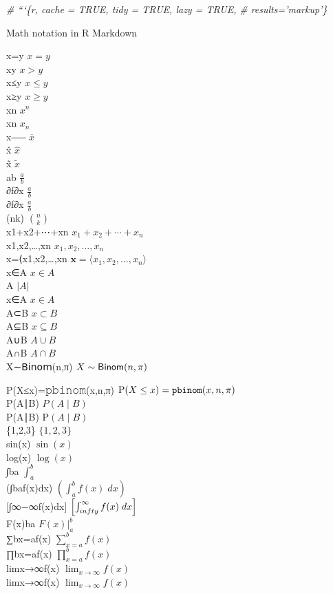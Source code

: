 \documentclass[10,portrait]{article}
\newenvironment{Shaded}{\begin{snugshade}}{\end{snugshade}}
\newcommand{\CommentTok}[1]{\textcolor[rgb]{0.56,0.35,0.01}{\textit{#1}}}
\begin{document}
\begin{Shaded}
\begin{Highlighting}[]
\CommentTok{# ```\{r, cache = TRUE, tidy = TRUE, lazy = TRUE,}
\CommentTok{# results='markup'\}}
\end{Highlighting}
\end{Shaded}

Math notation in R Markdown

x=y \(x = y\)\\
xy \(x > y\)\\
x≤y \(x \le y\)\\
x≥y \(x \ge y\)\\
xn \(x^{n}\)\\
xn \(x_{n}\)\\
x⎯⎯⎯ \(\overline{x}\)\\
x̂ \(\hat{x}\)\\
x̃ \(\tilde{x}\)\\
ab \(\frac{a}{b}\)\\
∂f∂x \(\frac{a}{b}\)\\
∂f∂x \(\displaystyle \frac{a}{b}\)\\
(nk) \(\binom{n}{k}\)\\
x1+x2+⋯+xn \(x_{1} + x_{2} + \cdots + x_{n}\)\\
x1,x2,\ldots{},xn \(x_{1}, x_{2}, \dots, x_{n}\)\\
x=⟨x1,x2,\ldots{},xn
\(\mathbf{x} = \langle x_{1}, x_{2}, \dots, x_{n}\rangle\)\\
x∈A \(x \in A\)\\
\textbar{}A\textbar{} \(|A|\)\\
x∈A \(x \in A\)\\
A⊂B \(x \subset B\)\\
A⊆B \(x \subseteq B\)\\
A∪B \(A \cup B\)\\
A∩B \(A \cap B\)\\
X∼𝖡𝗂𝗇𝗈𝗆(n,π) \(X \sim {\sf Binom}(n, \pi)\)

P(X≤x)=𝚙𝚋𝚒𝚗𝚘𝚖(x,n,π) \(\mathrm{P}(X \le x) = {\tt pbinom}(x, n, \pi)\)\\
P(A∣B) \(P(A \mid B)\)\\
P(A∣B) \(\mathrm{P}(A \mid B)\)\\
\{1,2,3\} \(\{1, 2, 3\}\)\\
sin(x) \(\sin(x)\)\\
log(x) \(\log(x)\)\\
∫ba \(\int_{a}^{b}\)\\
(∫baf(x)dx) \(\left(\int_{a}^{b} f(x) \; dx\right)\)\\
{[}∫∞−∞f(x)dx{]} \(\left[\int_{\-infty}^{\infty} f(x) \; dx\right]\)\\
F(x)\textbar{}ba \(\left. F(x) \right|_{a}^{b}\)\\
∑bx=af(x) \(\sum_{x = a}^{b} f(x)\)\\
∏bx=af(x) \(\prod_{x = a}^{b} f(x)\)\\
limx→∞f(x) \(\lim_{x \to \infty} f(x)\)\\
limx→∞f(x) \(\displaystyle \lim_{x \to \infty} f(x)\)
\end{document}
